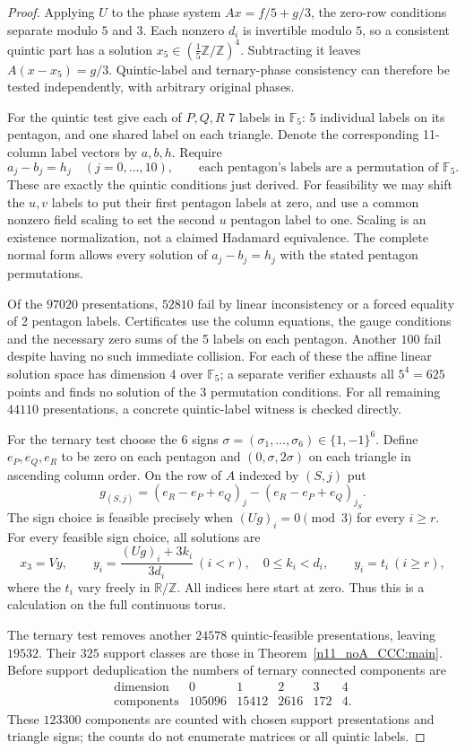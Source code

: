 \documentclass[11pt,a4paper]{article}
\theoremstyle{plain}
\theoremstyle{definition}
\theoremstyle{plain}
\begin{document}
\begin{proof}
Applying $U$ to the phase system $Ax=f/5+g/3$, the zero-row conditions separate modulo $5$ and $3$. Each nonzero $d_i$ is invertible modulo $5$, so a consistent quintic part has a solution $x_5\in(\frac15\mathbb Z/\mathbb Z)^4$. Subtracting it leaves $A(x-x_5)=g/3$. Quintic-label and ternary-phase consistency can therefore be tested independently, with arbitrary original phases.

\medskip
For the quintic test give each of $P,Q,R$ 7 labels in $\mathbb{F}_5$: 5 individual labels on its pentagon, and one shared label on each triangle. Denote the corresponding 11-column label vectors by $a,b,h$. Require
\[
a_j-b_j=h_j\quad(j=0,\ldots,10), \qquad\text{each pentagon's labels are a permutation of }\mathbb{F}_5.
\]
These are exactly the quintic conditions just derived. For feasibility we may shift the $u,v$ labels to put their first pentagon labels at zero, and use a common nonzero field scaling to set the second $u$ pentagon label to one. Scaling is an existence normalization, not a claimed Hadamard equivalence. The complete normal form allows every solution of $a_j-b_j=h_j$ with the stated pentagon permutations.

Of the $97020$ presentations, $52810$ fail by linear inconsistency or a forced equality of 2 pentagon labels. Certificates use the column equations, the gauge conditions and the necessary zero sums of the 5 labels on each pentagon. Another $100$ fail despite having no such immediate collision. For each of these the affine linear solution space has dimension 4 over $\mathbb{F}_5$; a separate verifier exhausts all $5^4=625$ points and finds no solution of the 3 permutation conditions. For all remaining $44110$ presentations, a concrete quintic-label witness is checked directly.

For the ternary test choose the 6 signs $\sigma=(\sigma_1,\ldots,\sigma_6)\in\{1,-1\}^6$. Define $e_P,e_Q,e_R$ to be zero on each pentagon and $(0,\sigma,2\sigma)$ on each triangle in ascending column order. On the row of $A$ indexed by $(S,j)$ put
$$g_{(S,j)}=(e_R-e_P+e_Q)_j-(e_R-e_P+e_Q)_{j_S}.$$
The sign choice is feasible precisely when $(Ug)_i=0\pmod3$ for every $i\ge r$. For every feasible sign choice, all solutions are
\[
x_3=Vy,\qquad y_i=\frac{(Ug)_i+3k_i}{3d_i}\ (i<r),\quad 0\le k_i<d_i,\qquad y_i=t_i\ (i\ge r),
\]
where the $t_i$ vary freely in $\mathbb R/\mathbb{Z}$. All indices here start at zero. Thus this is a calculation on the full continuous torus.

The ternary test removes another $24578$ quintic-feasible presentations, leaving $19532$. Their $325$ support classes are those in Theorem~\ref{n11_noA_CCC:main}. Before support deduplication the numbers of ternary connected components are
$$\begin{array}{c|rrrrr}
\text{dimension}&0&1&2&3&4\\\hline
\text{components}&105096&15412&2616&172&4.
\end{array}$$
These $123300$ components are counted with chosen support presentations and triangle signs; the counts do not enumerate matrices or all quintic labels.


\end{proof}
\end{document}
